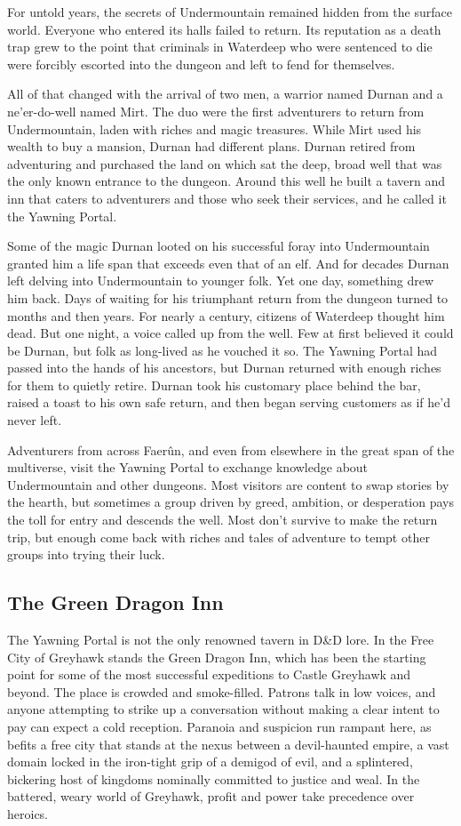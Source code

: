 \documentclass[10pt,a4paper,twoside,bg=print,twocolumn,openany,nodeprecatedcode]{dndbook}
\begin{document}
For untold years, the secrets of Undermountain remained hidden from the surface world. Everyone who entered its halls failed to return. Its reputation as a death trap grew to the point that criminals in Waterdeep who were sentenced to die were forcibly escorted into the dungeon and left to fend for themselves.

All of that changed with the arrival of two men, a warrior named Durnan and a ne'er-do-well named Mirt. The duo were the first adventurers to return from Undermountain, laden with riches and magic treasures. While Mirt used his wealth to buy a mansion, Durnan had different plans. Durnan retired from adventuring and purchased the land on which sat the deep, broad well that was the only known entrance to the dungeon. Around this well he built a tavern and inn that caters to adventurers and those who seek their services, and he called it the Yawning Portal.

Some of the magic Durnan looted on his successful foray into Undermountain granted him a life span that exceeds even that of an elf. And for decades Durnan left delving into Undermountain to younger folk. Yet one day, something drew him back. Days of waiting for his triumphant return from the dungeon turned to months and then years. For nearly a century, citizens of Waterdeep thought him dead. But one night, a voice called up from the well. Few at first believed it could be Durnan, but folk as long-lived as he vouched it so. The Yawning Portal had passed into the hands of his ancestors, but Durnan returned with enough riches for them to quietly retire. Durnan took his customary place behind the bar, raised a toast to his own safe return, and then began serving customers as if he'd never left.

Adventurers from across Faerûn, and even from elsewhere in the great span of the multiverse, visit the Yawning Portal to exchange knowledge about Undermountain and other dungeons. Most visitors are content to swap stories by the hearth, but sometimes a group driven by greed, ambition, or desperation pays the toll for entry and descends the well. Most don't survive to make the return trip, but enough come back with riches and tales of adventure to tempt other groups into trying their luck.

\subsection{The Green Dragon Inn}
The Yawning Portal is not the only renowned tavern in D\&D lore. In the Free City of Greyhawk stands the Green Dragon Inn, which has been the starting point for some of the most successful expeditions to Castle Greyhawk and beyond. The place is crowded and smoke-filled. Patrons talk in low voices, and anyone attempting to strike up a conversation without making a clear intent to pay can expect a cold reception. Paranoia and suspicion run rampant here, as befits a free city that stands at the nexus between a devil-haunted empire, a vast domain locked in the iron-tight grip of a demigod of evil, and a splintered, bickering host of kingdoms nominally committed to justice and weal. In the battered, weary world of Greyhawk, profit and power take precedence over heroics.
\end{document}
